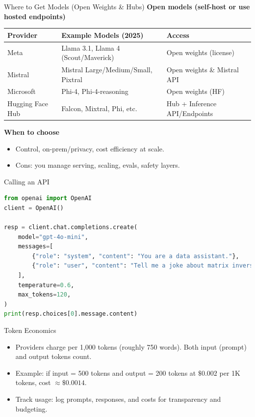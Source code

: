 \documentclass[aspectratio=169]{beamer}
\begin{document}
\begin{frame}{Where to Get Models (Open Weights \& Hubs)}
  \vspace{-0.3em}
  \textbf{Open models (self-host or use hosted endpoints)}
  \begin{center}
    \begin{tabular}{@{}lll@{}}
      \toprule
      Provider & Example Models (2025) & Access \\
      \midrule
      Meta & Llama 3.1, Llama 4 (Scout/Maverick) & Open weights (license) \\
      Mistral & Mistral Large/Medium/Small, Pixtral & Open weights \& Mistral API \\
      Microsoft & Phi-4, Phi-4-reasoning & Open weights (HF) \\
      Hugging Face Hub & Falcon, Mixtral, Phi, etc. & Hub + Inference API/Endpoints \\
      \bottomrule
    \end{tabular}
  \end{center}

  \vspace{0.6em}
  \textbf{When to choose}
  \begin{itemize}
    \item Control, on-prem/privacy, cost efficiency at scale.
    \item Cons: you manage serving, scaling, evals, safety layers.
  \end{itemize}
\end{frame}

\begin{frame}[fragile]{Calling an API}
  \begin{lstlisting}[language=Python]
from openai import OpenAI
client = OpenAI()

resp = client.chat.completions.create(
    model="gpt-4o-mini",
    messages=[
        {"role": "system", "content": "You are a data assistant."},
        {"role": "user", "content": "Tell me a joke about matrix inversion."}
    ],
    temperature=0.6,
    max_tokens=120,
)
print(resp.choices[0].message.content)
  \end{lstlisting}
\end{frame}

\begin{frame}{Token Economics}
  \begin{itemize}
    \item Providers charge per 1,000 tokens (roughly 750 words). Both input (prompt) and output tokens count.
    \item Example: if input = 500 tokens and output = 200 tokens at $\$0.002$ per 1K tokens, cost $\approx \$0.0014$.
    \item Track usage: log prompts, responses, and costs for transparency and budgeting.
  \end{itemize}
\end{frame}
\end{document}
